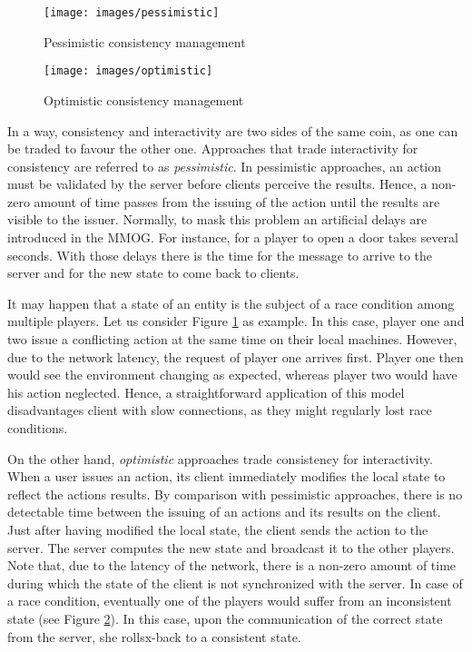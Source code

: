 \documentclass[final,10pt,a5paper]{phdimt}
\theoremstyle{definition}
\begin{document}
\begin{figure}[tbh]
\centering
\texttt{[image: images/pessimistic]}
\caption{Pessimistic consistency management}\label{fig:pessimistic}
\end{figure}


\begin{figure}[tbh]
\centering
\texttt{[image: images/optimistic]}
\caption{Optimistic consistency management}\label{fig:optimistic}
\end{figure}


In a way, consistency and interactivity are two sides of the same coin, as one can be traded to favour the other one.
Approaches that trade interactivity for consistency are referred to as \textit{pessimistic}. 
In pessimistic approaches, an action must be validated by the server before clients perceive the results.
Hence, a non-zero amount of time passes from the issuing of the action until the results are visible to the issuer. 
Normally, to mask this problem an artificial delays are introduced in the MMOG. For instance, for a player to open a door takes several seconds. With those delays there is the time for the message to arrive to the server and for the new state to come back to clients.


It may happen that a state of an entity is the subject of a race condition among multiple players. Let us consider Figure  \ref{fig:pessimistic} as example. In this case, player one and two issue a conflicting action at the same time on their local machines. However, due to the network latency, the request of player one arrives first. Player one then would see the environment changing as expected, whereas player two would have his action neglected.
Hence, a straightforward application of this model disadvantages client with slow connections, as they might regularly lost race conditions.


On the other hand, \textit{optimistic} approaches trade consistency for interactivity. 
When a user issues an action, its client immediately modifies the local state to reflect the actions results.
By comparison with pessimistic approaches, there is no detectable time between the issuing of an actions and its results on the client.
Just after having modified the local state, the client sends the action to the server.
The server computes the new state and broadcast it to the other players.
Note that, due to the latency of the network, there is a non-zero amount of time during which the state of the client is not synchronized with the server.
In case of a race condition, eventually one of the players would suffer from an inconsistent state (see Figure \ref{fig:optimistic}).
In this case, upon the communication of the correct state from the server, she rollsx-back to a consistent state.
\end{document}
